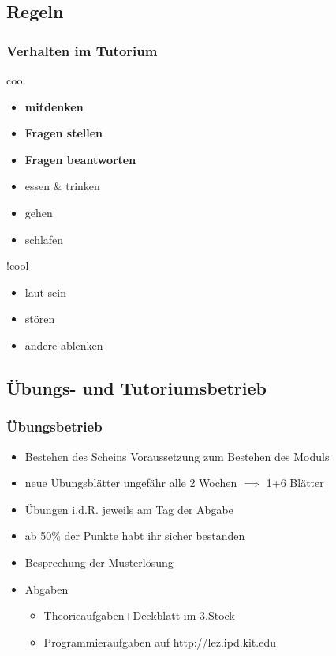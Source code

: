 \documentclass[18pt]{beamer}
\begin{document}
	\subsection{Regeln}
		\begin{frame}
			\frametitle{Verhalten im Tutorium}
			\begin{block}{cool}
				\begin{itemize}
					\item \textbf{mitdenken}
					\item \textbf{Fragen stellen}
					\item \textbf{Fragen beantworten}
					\item essen \& trinken
					\item gehen
					\item schlafen
				\end{itemize}
			\end{block}
			\pause
			\begin{block}{!cool}
				\begin{itemize}
					\item laut sein
					\item stören
					\item andere ablenken
				\end{itemize}
			\end{block}
		\end{frame}
		
	\subsection{Übungs- und Tutoriumsbetrieb}
		\begin{frame}
			\frametitle{Übungsbetrieb}
			\begin{itemize}
				\item Bestehen des Scheins Voraussetzung zum Bestehen des Moduls
				\item neue Übungsblätter ungefähr alle 2 Wochen $\implies$ 1+6 Blätter
				\item Übungen i.d.R. jeweils am Tag der Abgabe
				\item ab 50\% der Punkte habt ihr sicher bestanden
				\item Besprechung der Musterlösung
				\item Abgaben
					\begin{itemize}
						\item Theorieaufgaben+Deckblatt im 3.Stock
						\item Programmieraufgaben auf http://lez.ipd.kit.edu 
					\end{itemize}
			\end{itemize}
		\end{frame}
		
\end{document}
